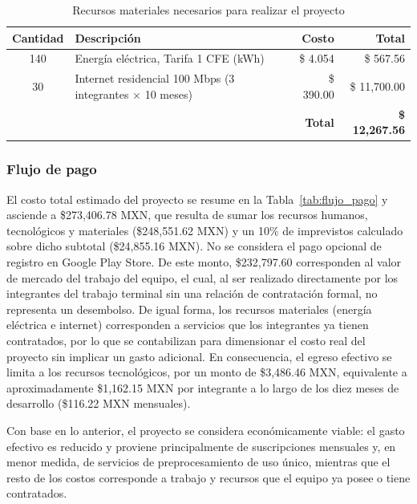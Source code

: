 \begin{table}[htbp]
    \centering
    \caption[Recursos materiales necesarios para realizar el proyecto]{Recursos materiales necesarios para realizar el proyecto}
    \label{tab:recursos_materiales}
    \begin{tabularx}{\textwidth}{|c|X|r|r|}
        \hline
        \textbf{Cantidad} & \textbf{Descripción} & \textbf{Costo} & \textbf{Total} \\ \hline
        140 & Energía eléctrica, Tarifa 1 CFE (kWh) & \$ 4.054 & \$ 567.56 \\ \hline
        30 & Internet residencial 100 Mbps (3 integrantes $\times$ 10 meses) & \$ 390.00 & \$ 11,700.00 \\ \hline
        \multicolumn{3}{|r|}{\textbf{Total}} & \textbf{\$ 12,267.56} \\ \hline
    \end{tabularx}
\end{table}

\subsubsection{Flujo de pago}

El costo total estimado del proyecto se resume en la Tabla~\ref{tab:flujo_pago} y asciende a \$273,406.78 MXN, que resulta de sumar los recursos humanos, tecnológicos y materiales (\$248,551.62 MXN) y un 10\% de imprevistos calculado sobre dicho subtotal (\$24,855.16 MXN). No se considera el pago opcional de registro en Google Play Store. De este monto, \$232,797.60 corresponden al valor de mercado del trabajo del equipo, el cual, al ser realizado directamente por los integrantes del trabajo terminal sin una relación de contratación formal, no representa un desembolso. De igual forma, los recursos materiales (energía eléctrica e internet) corresponden a servicios que los integrantes ya tienen contratados, por lo que se contabilizan para dimensionar el costo real del proyecto sin implicar un gasto adicional. En consecuencia, el egreso efectivo se limita a los recursos tecnológicos, por un monto de \$3,486.46 MXN, equivalente a aproximadamente \$1,162.15 MXN por integrante a lo largo de los diez meses de desarrollo (\$116.22 MXN mensuales).

Con base en lo anterior, el proyecto se considera económicamente viable: el gasto efectivo es reducido y proviene principalmente de suscripciones mensuales y, en menor medida, de servicios de preprocesamiento de uso único, mientras que el resto de los costos corresponde a trabajo y recursos que el equipo ya posee o tiene contratados.

